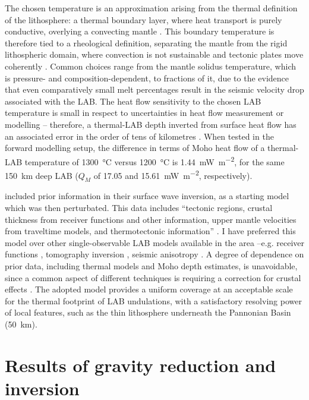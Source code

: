 The chosen temperature is an approximation arising from the thermal definition of the lithosphere: a thermal boundary layer, where heat transport is purely conductive, overlying a convecting mantle \parencites{Eaton2009}{fischer2010lab}.
This boundary temperature is therefore tied to a rheological definition, separating the mantle from the rigid lithospheric domain, where convection is not sustainable and tectonic plates move coherently \parencite{Steinberger2016}.
Common choices range from the mantle solidus temperature, which is pressure- and composition-dependent, to fractions of it, due to the evidence that even comparatively small melt percentages result in the seismic velocity drop associated with the LAB.
The heat flow sensitivity to the chosen LAB temperature is small in respect to uncertainties in heat flow measurement or modelling -- therefore, a thermal-LAB depth inverted from surface heat flow has an associated error in the order of tens of kilometres \parencite{Afonso2013multiobsI}.
When tested in the forward modelling setup, the difference in terms of Moho heat flow of a thermal-LAB temperature of \SI{1300}{\celsius} versus \SI{1200}{\celsius} is 1.44~\si{\milli \watt \per \square \metre}, for the same 150~\si{\kilo \metre} deep LAB ($Q_M$ of 17.05 and 15.61~\si{\milli \watt \per \square \metre}, respectively).

\textcite{Pasyanos2014} included prior information in their surface wave inversion, as a starting model which was then perturbated.
This data includes ``tectonic regions, crustal thickness from receiver functions and other information, upper mantle velocities from traveltime models, and thermotectonic information'' \parencite[p. 2154, ][]{Pasyanos2014}.
I have preferred this model over other single-observable LAB models available in the area --e.g. receiver functions \parencite{Geissler2010}, tomography inversion \parencite{Tesauro2009}, seismic anisotropy \parencite{Plomerova2010}.
A degree of dependence on prior data, including thermal models and Moho depth estimates, is unavoidable, since a common aspect of different techniques is requiring a correction for crustal effects \parencite{Jones2010}.
The adopted model provides a uniform coverage at an acceptable scale for the thermal footprint of LAB undulations, with a satisfactory resolving power of local features, such as the thin lithosphere underneath the Pannonian Basin (\SI{50}{\kilo \metre}).

\section{Results of gravity reduction and inversion}
\label{s:Appl:DiscGrav}

